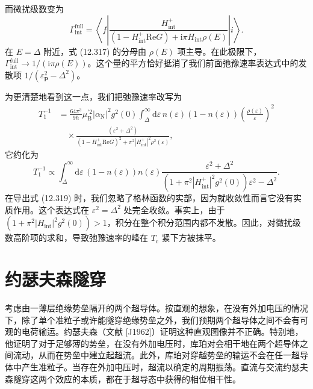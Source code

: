 而微扰级数变为
\begin{equation*}
\Gamma_{\mathrm{int}}^{\mathrm{full}}=\left\langle f\left|\frac{H_{\mathrm{int}}^{+}}{\left(1-H_{\mathrm{int}}^{+}\mathrm{Re}G\right)+\mathrm{i}\pi H_{\mathrm{int}}\rho(E)}\right|i\right\rangle.\tag{12.317}
\end{equation*}
在 $E=\Delta$ 附近，式 (12.317) 的分母由 $\rho(E)$ 项主导。在此极限下，$\Gamma_{\mathrm{int}}^{\mathrm{full}}\to 1/\left(\mathrm{i}\pi\rho(E)\right)$。这个量的平方恰好抵消了我们前面弛豫速率表达式中的发散项 $1/\left(\varepsilon_{\mathbf{p}}^{2}-\Delta^{2}\right)$。

为更清楚地看到这一点，我们把弛豫速率改写为
\begin{align*}
T_{1}^{-1}&=\frac{64\pi^{3}}{9\hbar}\mu_{\mathrm{B}}^{\prime 2}\left|\alpha_{\mathrm{N}}\right|^{2}g^{2}(0)\int_{\Delta}^{\infty}\mathrm{d}\varepsilon\,n(\varepsilon)\left(1-n(\varepsilon)\right)\left(\frac{\rho(\varepsilon)}{\varepsilon}\right)^{2}\\
&\quad\times\frac{\left(\varepsilon^{2}+\Delta^{2}\right)}{\left(1-H_{\mathrm{int}}^{+}\mathrm{Re}G\right)^{2}+\pi^{2}\left|H_{\mathrm{int}}^{+}\right|^{2}\rho^{2}(\varepsilon)},\tag{12.318}
\end{align*}
它约化为
\begin{equation*}
T_{1}^{-1}\propto\int_{\Delta}^{\infty}\mathrm{d}\varepsilon\,\left(1-n(\varepsilon)\right)n(\varepsilon)\frac{\varepsilon^{2}+\Delta^{2}}{\left(1+\pi^{2}\left|H_{\mathrm{int}}^{+}\right|^{2}g^{2}(0)\right)\varepsilon^{2}-\Delta^{2}}.\tag{12.319}
\end{equation*}
在导出式 (12.319) 时，我们忽略了格林函数的实部，因为就收敛性而言它没有实质作用。这个表达式在 $\varepsilon^{2}=\Delta^{2}$ 处完全收敛。事实上，由于 $\left(1+\pi^{2}|H_{\mathrm{int}}|^{2}g^{2}(0)\right)>1$，积分在整个积分范围内都不发散。因此，对微扰级数高阶项的求和，导致弛豫速率的峰在 $T_{\mathrm{c}}$ 紧下方被抹平。

\section{约瑟夫森隧穿}

考虑由一薄层绝缘势垒隔开的两个超导体。按直观的想象，在没有外加电压的情况下，除了单个准粒子或许能隧穿绝缘势垒之外，我们预期两个超导体之间不会有可观的电荷输运。约瑟夫森（文献 [J1962]）证明这种直观图像并不正确。特别地，他证明了对于足够薄的势垒，在没有外加电压时，库珀对会相干地在两个超导体之间流动，从而在势垒中建立起超流。此外，库珀对穿越势垒的输运不会在任一超导体中产生准粒子。当存在外加电压时，超流以确定的周期振荡。直流与交流约瑟夫森隧穿这两个效应的本质，都在于超导态中获得的相位相干性。

